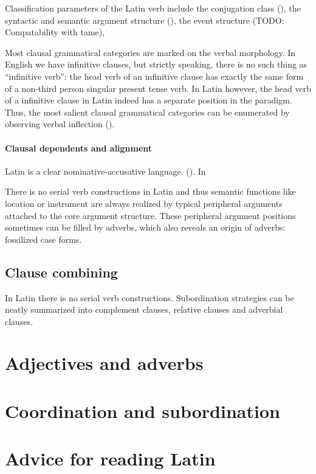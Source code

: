 \documentclass[a4paper, oneside, 12pt]{report}
\begin{document}
Classification parameters of the Latin verb include 
the conjugation class (),
the syntactic and semantic argument structure
(), 
the event structure (TODO: Compatability with \acs{tame}),

Most clausal grammatical categories are marked on the verbal morphology.
In English we have infinitive clauses,
but strictly speaking, there is no such thing as ``infinitive verb'':
the head verb of an infinitive clause 
has exactly the same form of a non-third person singular present tense verb.
In Latin however, the head verb of a infinitive clause in Latin 
indeed has a separate position in the paradigm.
Thus, the most salient clausal grammatical categories can be enumerated  
by observing verbal inflection ().


\paragraph*{Clausal dependents and alignment}

Latin is a clear nominative-accusative language.
().
In 


There is no serial verb constructions in Latin 
and thus semantic functions like location or instrument 
are always realized by typical peripheral arguments
attached to the core argument structure.
These peripheral argument positions sometimes can be filled by adverbs,
which also reveals an origin of adverbs: fossilized case forms.

\subsection{Clause combining}

In Latin there is no serial verb constructions.
Subordination strategies can be neatly summarized into 
complement clauses, relative clauses and adverbial clauses.

\section{Adjectives and adverbs}

\section{Coordination and subordination}

\section{Advice for reading Latin}
\end{document}
